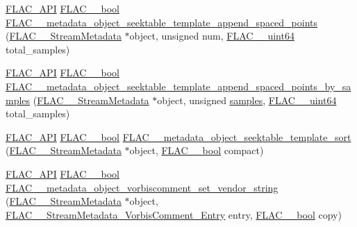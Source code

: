 \begin{DoxyCompactItemize}
\item 
\hyperlink{group__flac__export_ga56ca07df8a23310707732b1c0007d6f5}{F\+L\+A\+C\+\_\+\+A\+PI} \hyperlink{ordinals_8h_a95103469f1cbd78b8cf250194985b34e}{F\+L\+A\+C\+\_\+\+\_\+bool} \hyperlink{group__flac__metadata__object_gab96c6585578c87f6853731860e2872e0}{F\+L\+A\+C\+\_\+\+\_\+metadata\+\_\+object\+\_\+seektable\+\_\+template\+\_\+append\+\_\+spaced\+\_\+points} (\hyperlink{struct_f_l_a_c_____stream_metadata}{F\+L\+A\+C\+\_\+\+\_\+\+Stream\+Metadata} $\ast$object, unsigned num, \hyperlink{ordinals_8h_aa78c8c70a3eb8a58af7436f278acde8e}{F\+L\+A\+C\+\_\+\+\_\+uint64} total\+\_\+samples)
\item 
\hyperlink{group__flac__export_ga56ca07df8a23310707732b1c0007d6f5}{F\+L\+A\+C\+\_\+\+A\+PI} \hyperlink{ordinals_8h_a95103469f1cbd78b8cf250194985b34e}{F\+L\+A\+C\+\_\+\+\_\+bool} \hyperlink{group__flac__metadata__object_gabf797b64b96808cabf1d995573680fe9}{F\+L\+A\+C\+\_\+\+\_\+metadata\+\_\+object\+\_\+seektable\+\_\+template\+\_\+append\+\_\+spaced\+\_\+points\+\_\+by\+\_\+samples} (\hyperlink{struct_f_l_a_c_____stream_metadata}{F\+L\+A\+C\+\_\+\+\_\+\+Stream\+Metadata} $\ast$object, unsigned \hyperlink{test__w__saw8_8c_a54185623a5a093f671a73e5fba6197a1}{samples}, \hyperlink{ordinals_8h_aa78c8c70a3eb8a58af7436f278acde8e}{F\+L\+A\+C\+\_\+\+\_\+uint64} total\+\_\+samples)
\item 
\hyperlink{group__flac__export_ga56ca07df8a23310707732b1c0007d6f5}{F\+L\+A\+C\+\_\+\+A\+PI} \hyperlink{ordinals_8h_a95103469f1cbd78b8cf250194985b34e}{F\+L\+A\+C\+\_\+\+\_\+bool} \hyperlink{group__flac__metadata__object_gaee6a1f08321b56a3fa65af94dd7830cd}{F\+L\+A\+C\+\_\+\+\_\+metadata\+\_\+object\+\_\+seektable\+\_\+template\+\_\+sort} (\hyperlink{struct_f_l_a_c_____stream_metadata}{F\+L\+A\+C\+\_\+\+\_\+\+Stream\+Metadata} $\ast$object, \hyperlink{ordinals_8h_a95103469f1cbd78b8cf250194985b34e}{F\+L\+A\+C\+\_\+\+\_\+bool} compact)
\item 
\hyperlink{group__flac__export_ga56ca07df8a23310707732b1c0007d6f5}{F\+L\+A\+C\+\_\+\+A\+PI} \hyperlink{ordinals_8h_a95103469f1cbd78b8cf250194985b34e}{F\+L\+A\+C\+\_\+\+\_\+bool} \hyperlink{group__flac__metadata__object_gabfc6277c08a86329efd19572695b57e6}{F\+L\+A\+C\+\_\+\+\_\+metadata\+\_\+object\+\_\+vorbiscomment\+\_\+set\+\_\+vendor\+\_\+string} (\hyperlink{struct_f_l_a_c_____stream_metadata}{F\+L\+A\+C\+\_\+\+\_\+\+Stream\+Metadata} $\ast$object, \hyperlink{struct_f_l_a_c_____stream_metadata___vorbis_comment___entry}{F\+L\+A\+C\+\_\+\+\_\+\+Stream\+Metadata\+\_\+\+Vorbis\+Comment\+\_\+\+Entry} entry, \hyperlink{ordinals_8h_a95103469f1cbd78b8cf250194985b34e}{F\+L\+A\+C\+\_\+\+\_\+bool} copy)

\end{DoxyCompactItemize}
